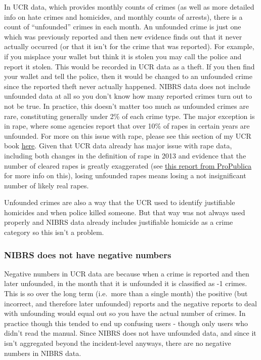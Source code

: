 \documentclass[
  12pt,
  openany]{book}
\begin{document}
In UCR data, which provides monthly counts of crimes (as well as more detailed info on hate crimes and homicides, and monthly counts of arrests), there is a count of ``unfounded'' crimes in each month. An unfounded crime is just one which was previously reported and then new evidence finds out that it never actually occurred (or that it isn't for the crime that was reported). For example, if you misplace your wallet but think it is stolen you may call the police and report it stolen. This would be recorded in UCR data as a theft. If you then find your wallet and tell the police, then it would be changed to an unfounded crime since the reported theft never actually happened. NIBRS data does not include unfounded data at all so you don't know how many reported crimes turn out to not be true. In practice, this doesn't matter too much as unfounded crimes are rare, constituting generally under 2\% of each crime type. The major exception is in rape, where some agencies report that over 10\% of rapes in certain years are unfounded. For more on this issue with rape, please see this section of my UCR book \href{https://ucrbook.com/offensesKnown.html\#unfounded-crimes}{here}.
Given that UCR data already has major issue with rape data, including both changes in the definition of rape in 2013 and evidence that the number of cleared rapes is greatly exaggerated (see \href{https://www.propublica.org/article/when-it-comes-to-rape-just-because-a-case-is-cleared-does-not-mean-solved}{this report from ProPublica} for more info on this), losing unfounded rapes means losing a not insignificant number of likely real rapes.

Unfounded crimes are also a way that the UCR used to identify justifiable homicides and when police killed someone. But that way was not always used properly and NIBRS data already includes justifiable homicide as a crime category so this isn't a problem.

\subsubsection{NIBRS does not have negative numbers}\label{nibrs-does-not-have-negative-numbers}

Negative numbers in UCR data are because when a crime is reported and then later unfounded, in the month that it is unfounded it is classified as -1 crimes. This is so over the long term (i.e.~more than a single month) the positive (but incorrect, and therefore later unfounded) reports and the negative reports to deal with unfounding would equal out so you have the actual number of crimes. In practice though this tended to end up confusing users - though only users who didn't read the manual. Since NIBRS does not have unfounded data, and since it isn't aggregated beyond the incident-level anyways, there are no negative numbers in NIBRS data.
\end{document}
